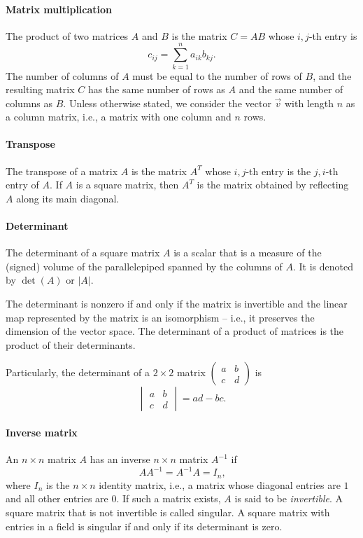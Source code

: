 \paragraph{Matrix multiplication}  The product of two matrices $A$ and $B$ is the matrix
$C = A B$ whose $i, j$-th entry is $$c_{ij} = \sum_{k = 1}^n a_{ik} b_{kj}\text{.}$$
The number of columns of $A$ must be equal to the number of rows of $B$, and the
resulting matrix $C$ has the same number of rows as $A$ and the same number of columns as $B$.
Unless otherwise stated, we consider the vector $\vec{v}$ with length $n$ as a column
matrix, i.e., a matrix with one column and $n$ rows.

\paragraph{Transpose}  The transpose of a matrix $A$ is the matrix $A^T$ whose $i, j$-th
entry is the $j, i$-th entry of $A$.  If $A$ is a square matrix, then $A^T$ is the
matrix obtained by reflecting $A$ along its main diagonal.

\paragraph{Determinant}  The determinant of a square matrix $A$ is a scalar that is a
measure of the (signed) volume of the parallelepiped spanned by the columns of $A$.  It is
denoted by $\det(A)$ or $|A|$.

The determinant is nonzero if and only if the matrix is invertible and the linear map
represented by the matrix is an isomorphism -- i.e., it preserves the dimension of the
vector space.  The determinant of a product of matrices is the product of their
determinants.

Particularly, the determinant of a $2 \times 2$ matrix $\begin{pmatrix} a & b \\ c & d
\end{pmatrix}$ is $$\begin{vmatrix} a & b \\ c & d \end{vmatrix} = ad - bc\text{.}$$

\paragraph{Inverse matrix}  An $n \times n$ matrix $A$ has an inverse $n \times n$ matrix
$A^{-1}$ if
\[
  A A^{-1} = A^{-1} A = I_n\text{,}
\]
where $I_n$ is the $n \times n$ identity matrix, i.e., a matrix whose diagonal entries are
$1$ and all other entries are $0$. If such a matrix exists, $A$ is said to be
\emph{invertible}.  A square matrix that is not invertible is called singular. A square
matrix with entries in a field is singular if and only if its determinant is zero.

